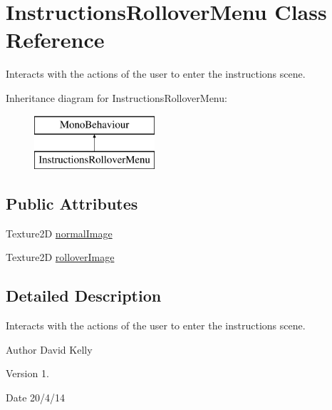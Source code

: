 \hypertarget{class_instructions_rollover_menu}{\section{Instructions\-Rollover\-Menu Class Reference}
\label{class_instructions_rollover_menu}
}


Interacts with the actions of the user to enter the instructions scene.  


Inheritance diagram for Instructions\-Rollover\-Menu\-:\begin{figure}[H]
\begin{center}
\leavevmode
\includegraphics[height=2.000000cm]{class_instructions_rollover_menu}
\end{center}
\end{figure}
\subsection*{Public Attributes}
\begin{DoxyCompactItemize}
\item 
Texture2\-D \hyperlink{class_instructions_rollover_menu_abc4315ea253fbea4491da43647f1aae2}{normal\-Image}
\item 
Texture2\-D \hyperlink{class_instructions_rollover_menu_a858d6b4b9e15fcb415a51561845618ef}{rollover\-Image}
\end{DoxyCompactItemize}


\subsection{Detailed Description}
Interacts with the actions of the user to enter the instructions scene. 

\begin{DoxyAuthor}{Author}
David Kelly 
\end{DoxyAuthor}
\begin{DoxyVersion}{Version}
1. 
\end{DoxyVersion}
\begin{DoxyDate}{Date}
20/4/14 
\end{DoxyDate}


